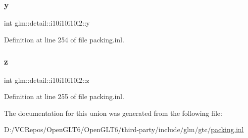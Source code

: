 \mbox{\label{unionglm_1_1detail_1_1i10i10i10i2_ae76bb89adeb66d1ee5bb2b265e87fc1b}} 
\subsubsection{\texorpdfstring{y}{y}}
{\footnotesize\ttfamily int glm\+::detail\+::i10i10i10i2\+::y}



Definition at line 254 of file packing.\+inl.

\mbox{\label{unionglm_1_1detail_1_1i10i10i10i2_a95398090414de32eaaf9cb3c3bd3fa48}} 
\subsubsection{\texorpdfstring{z}{z}}
{\footnotesize\ttfamily int glm\+::detail\+::i10i10i10i2\+::z}



Definition at line 255 of file packing.\+inl.



The documentation for this union was generated from the following file\+:\begin{DoxyCompactItemize}
\item 
D\+:/\+V\+C\+Repos/\+Open\+G\+L\+T6/\+Open\+G\+L\+T6/third-\/party/include/glm/gtc/\mbox{\hyperlink{packing_8inl}{packing.\+inl}}\end{DoxyCompactItemize}
